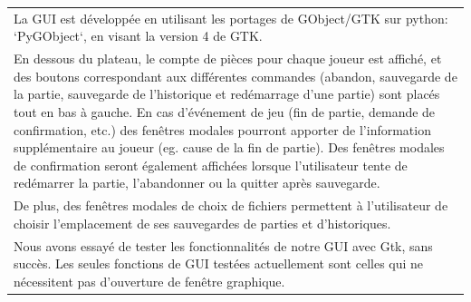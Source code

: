 \documentclass[a4paper,12pt]{article}
\begin{document}
\begin{tabularx}{\textwidth}{|X|}
    La GUI est développée en utilisant les portages de GObject/GTK sur python: `PyGObject`, en visant la version 4 de GTK.                                                                                                                                                                                                                                                                                                                                                                                                                                                                                                      \\
    En dessous du plateau, le compte de pièces pour chaque joueur est affiché, et des boutons correspondant aux différentes commandes (abandon, sauvegarde de la partie, sauvegarde de l’historique et redémarrage d’une partie) sont placés tout en bas à gauche. En cas d'événement de jeu (fin de partie, demande de confirmation, etc.) des fenêtres modales pourront apporter de l’information supplémentaire au joueur (eg. cause de la fin de partie). Des fenêtres modales de confirmation seront également affichées lorsque l’utilisateur tente de redémarrer la partie, l’abandonner ou la quitter après sauvegarde. \\
    De plus, des fenêtres modales de choix de fichiers permettent à l’utilisateur de choisir l’emplacement de ses sauvegardes de parties et d’historiques.                                                                                                                                                                                                                                                                                                                                                                                                                                                                      \\
    \arrayrulecolor{MediumAquamarine}\hline
    \arrayrulecolor{CornflowerBlue}
    Nous avons essayé de tester les fonctionnalités de notre GUI avec Gtk, sans succès. Les seules fonctions de GUI testées actuellement sont celles qui ne nécessitent pas d’ouverture de fenêtre graphique.                                                                                                                                                                                                                                                                                                                                                                                                                   \\

\end{tabularx}
\end{document}
